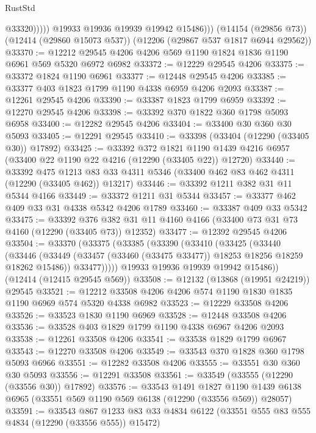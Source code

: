 \begin{lexlean}{RustStd}
\begin{coremodule}
                    @33320)))))
          @19933
          @19936
          @19939
          @19942
          @15486)))
    (@14154 (@29856 @73))
    (@12414 (@29860 @15073 @537))
    (@12206 (@29867 @537 @1817 @6944 @29562))
@33370 := @12212 @29545 @4206 @4206 @569 @1190 @1824 @1836 @1190 @6961 @569 @5320 @6972 @6982
@33372 := @12229 @29545 @4206
@33375 := @33372 @1824 @1190 @6961
@33377 := @12448 @29545 @4206
@33385 := @33377 @403 @1823 @1799 @1190 @4338 @6959 @4206 @2093
@33387 := @12261 @29545 @4206
@33390 := @33387 @1823 @1799 @6959
@33392 := @12270 @29545 @4206
@33398 := @33392 @370 @1822 @360 @1798 @5093 @6958
@33400 := @12282 @29545 @4206
@33404 := @33400 @30 @360 @30 @5093
@33405 := @12291 @29545
@33410 := @33398 (@33404 (@12290 (@33405 @30)) @17892)
@33425 := @33392
    @372
    @1821
    @1190
    @1439
    @4216
    @6957
    (@33400 @22 @1190 @22 @4216 (@12290 (@33405 @22)) @12720)
@33440 := @33392
    @475
    @1213
    @83
    @33
    @4311
    @5346
    (@33400 @462 @83 @462 @4311 (@12290 (@33405 @462)) @13217)
@33446 := @33392 @1211 @382 @31 @11 @5344 @4166
@33449 := @33372 @1211 @31 @5344
@33457 := @33377 @462 @409 @33 @31 @4338 @5342 @4206 @1789
@33460 := @33387 @409 @33 @5342
@33475 := @33392
    @376
    @382
    @31
    @11
    @4160
    @4166
    (@33400 @73 @31 @73 @4160 (@12290 (@33405 @73)) @12352)
@33477 := @12392 @29545 @4206
@33504 := @33370
    (@33375
      (@33385
        (@33390
          (@33410
            (@33425
              (@33440
                (@33446
                  (@33449 (@33457 (@33460 (@33475 @33477)) @18253 @18256 @18259 @18262 @15486))
                  @33477)))))
        @19933
        @19936
        @19939
        @19942
        @15486))
    (@12414 (@12415 @29545 @569))
@33508 := @12132 (@13868 (@19951 @24219)) @29545
@33521 := @12212 @33508 @4206 @4206 @574 @1190 @1830 @1835 @1190 @6969 @574 @5320 @4338 @6982
@33523 := @12229 @33508 @4206
@33526 := @33523 @1830 @1190 @6969
@33528 := @12448 @33508 @4206
@33536 := @33528 @403 @1829 @1799 @1190 @4338 @6967 @4206 @2093
@33538 := @12261 @33508 @4206
@33541 := @33538 @1829 @1799 @6967
@33543 := @12270 @33508 @4206
@33549 := @33543 @370 @1828 @360 @1798 @5093 @6966
@33551 := @12282 @33508 @4206
@33555 := @33551 @30 @360 @30 @5093
@33556 := @12291 @33508
@33561 := @33549 (@33555 (@12290 (@33556 @30)) @17892)
@33576 := @33543
    @1491
    @1827
    @1190
    @1439
    @6138
    @6965
    (@33551 @569 @1190 @569 @6138 (@12290 (@33556 @569)) @28057)
@33591 := @33543
    @867
    @1233
    @83
    @33
    @4834
    @6122
    (@33551 @555 @83 @555 @4834 (@12290 (@33556 @555)) @15472)

\end{coremodule}
\end{lexlean}
